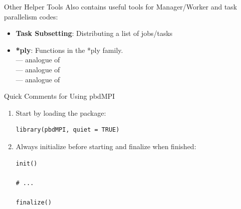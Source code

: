\begin{frame}
  \begin{block}{Other Helper Tools}\pause
   Also contains useful tools for Manager/Worker and task parallelism codes:
    \begin{itemize}
      \item \textbf{Task Subsetting}: Distributing a list of jobs/tasks\\ 
      \item \textbf{*ply}:  Functions in the *ply family.\\
       --- analogue of \\
       --- analogue of \\
       --- analogue of \\
    \end{itemize}
  \end{block}
\end{frame}






\begin{frame}[fragile]
  \begin{block}{Quick Comments for Using pbdMPI}\pause
    \begin{enumerate}
      \item Start by loading the package:
\vspace{-.4cm}
\begin{lstlisting}
library(pbdMPI, quiet = TRUE)
\end{lstlisting}
      \item Always initialize before starting and finalize when finished:
\vspace{-.4cm}
\begin{lstlisting}
init()

# ...

finalize()
\end{lstlisting}
\end{enumerate}
\end{block}
\end{frame}